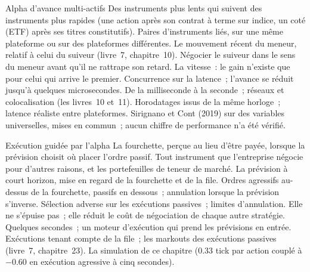\begin{strategyfile}{Alpha d'avance multi-actifs}\label{strat:s1:intraday-machine-learned-alphas:lead}
 Des instruments plus lents qui suivent des instruments plus rapides (une action après son contrat à terme sur indice, un  coté (ETF) après ses titres constitutifs).
 Paires d'instruments liés, sur une même plateforme ou sur des plateformes différentes.
 Le mouvement récent du meneur, relatif à celui du suiveur (livre~7, chapitre~10).
 Négocier le suiveur dans le sens du meneur avant qu'il ne rattrape son retard.
 La vitesse~: le gain n'existe que pour celui qui arrive le premier.
 Concurrence sur la latence~; l'avance se réduit jusqu'à quelques microsecondes.
 De la milliseconde à la seconde~; réseaux et colocalisation (les livres~10 et~11).
 Horodatages issus de la même horloge~; latence réaliste entre plateformes.
 Sirignano et Cont (2019) sur des variables universelles, mises en commun~; aucun chiffre de performance n'a été vérifié.
\end{strategyfile}

\begin{strategyfile}{Exécution guidée par l'alpha}\label{strat:s1:intraday-machine-learned-alphas:execution}
 La fourchette, perçue au lieu d'être payée, lorsque la prévision choisit où placer l'ordre passif.
 Tout instrument que l'entreprise négocie pour d'autres raisons, et les portefeuilles de teneur de marché.
 La prévision à court horizon, mise en regard de la fourchette et de la file.
 Ordres agressifs au-dessus de la fourchette, passifs en dessous~; annulation lorsque la prévision s'inverse.
 Sélection adverse sur les exécutions passives~; limites d'annulation.
 Elle ne s'épuise pas~; elle réduit le coût de négociation de chaque autre stratégie.
 Quelques secondes~; un moteur d'exécution qui prend les prévisions en entrée.
 Exécutions tenant compte de la file~; les markouts des exécutions passives (livre~7, chapitre~23).
 La simulation de ce chapitre (0.33 tick par action couplé à $-0.60$ en exécution agressive à cinq secondes).
\end{strategyfile}

